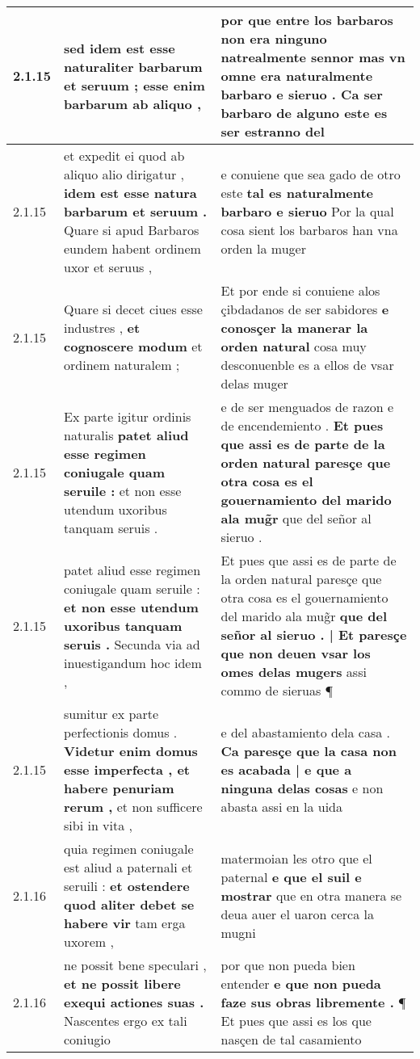 \begin{tabular}{|p{1cm}|p{6.5cm}|p{6.5cm}|}
2.1.15 & sed idem est \textbf{ esse naturaliter barbarum et seruum ; } esse enim barbarum ab aliquo , & por que entre los barbaros non era ninguno natrealmente sennor \textbf{ mas vn omne era naturalmente barbaro e sieruo . } Ca ser barbaro de alguno este es ser estranno del \\\hline
2.1.15 & et expedit ei quod ab aliquo alio dirigatur , \textbf{ idem est esse natura barbarum et seruum . } Quare si apud Barbaros eundem habent ordinem uxor et seruus , & e conuiene que sea gado de otro este \textbf{ tal es naturalmente barbaro e sieruo } Por la qual cosa sient los barbaros han vna orden la muger \\\hline
2.1.15 & Quare si decet ciues esse industres , \textbf{ et cognoscere modum } et ordinem naturalem ; & Et por ende si conuiene alos çibdadanos de ser sabidores \textbf{ e conosçer la manerar la orden natural } cosa muy desconuenble es a ellos de vsar delas muger \\\hline
2.1.15 & Ex parte igitur ordinis naturalis \textbf{ patet aliud esse regimen coniugale quam seruile : } et non esse utendum uxoribus tanquam seruis . & e de ser menguados de razon e de encendemiento . \textbf{ Et pues que assi es de parte de la orden natural paresçe que otra cosa es el gouernamiento del marido ala mug̃r } que del señor al sieruo . \\\hline
2.1.15 & patet aliud esse regimen coniugale quam seruile : \textbf{ et non esse utendum uxoribus tanquam seruis . } Secunda via ad inuestigandum hoc idem , & Et pues que assi es de parte de la orden natural paresçe que otra cosa es el gouernamiento del marido ala mug̃r \textbf{ que del señor al sieruo . | Et paresçe que non deuen vsar los omes delas mugers } assi commo de sieruas ¶ \\\hline
2.1.15 & sumitur ex parte perfectionis domus . \textbf{ Videtur enim domus esse imperfecta , et habere penuriam rerum , } et non sufficere sibi in vita , & e del abastamiento dela casa . \textbf{ Ca paresçe que la casa non es acabada | e que a ninguna delas cosas } e non abasta assi en la uida \\\hline
2.1.16 & quia regimen coniugale est aliud a paternali et seruili : \textbf{ et ostendere quod aliter debet se habere vir } tam erga uxorem , & matermoian les otro que el paternal \textbf{ e que el suil e mostrar } que en otra manera se deua auer el uaron cerca la mugni \\\hline
2.1.16 & ne possit bene speculari , \textbf{ et ne possit libere exequi actiones suas . } Nascentes ergo ex tali coniugio & por que non pueda bien entender \textbf{ e que non pueda faze sus obras libremente . } ¶ Et pues que assi es los que nasçen de tal casamiento \\\hline

\end{tabular}
